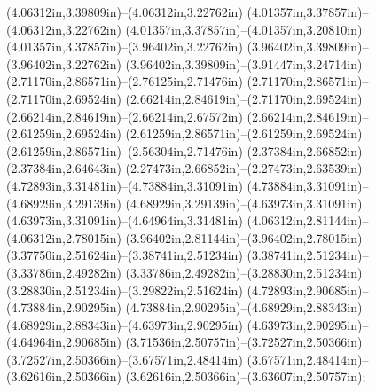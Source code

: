 (4.06312in,3.39809in)--(4.06312in,3.22762in) (4.01357in,3.37857in)--(4.06312in,3.22762in) (4.01357in,3.37857in)--(4.01357in,3.20810in) (4.01357in,3.37857in)--(3.96402in,3.22762in) (3.96402in,3.39809in)--(3.96402in,3.22762in) (3.96402in,3.39809in)--(3.91447in,3.24714in) (2.71170in,2.86571in)--(2.76125in,2.71476in) (2.71170in,2.86571in)--(2.71170in,2.69524in) (2.66214in,2.84619in)--(2.71170in,2.69524in) (2.66214in,2.84619in)--(2.66214in,2.67572in) (2.66214in,2.84619in)--(2.61259in,2.69524in) (2.61259in,2.86571in)--(2.61259in,2.69524in) (2.61259in,2.86571in)--(2.56304in,2.71476in) (2.37384in,2.66852in)--(2.37384in,2.64643in) (2.27473in,2.66852in)--(2.27473in,2.63539in) (4.72893in,3.31481in)--(4.73884in,3.31091in) (4.73884in,3.31091in)--(4.68929in,3.29139in) (4.68929in,3.29139in)--(4.63973in,3.31091in) (4.63973in,3.31091in)--(4.64964in,3.31481in) (4.06312in,2.81144in)--(4.06312in,2.78015in) (3.96402in,2.81144in)--(3.96402in,2.78015in) (3.37750in,2.51624in)--(3.38741in,2.51234in) (3.38741in,2.51234in)--(3.33786in,2.49282in) (3.33786in,2.49282in)--(3.28830in,2.51234in) (3.28830in,2.51234in)--(3.29822in,2.51624in) (4.72893in,2.90685in)--(4.73884in,2.90295in) (4.73884in,2.90295in)--(4.68929in,2.88343in) (4.68929in,2.88343in)--(4.63973in,2.90295in) (4.63973in,2.90295in)--(4.64964in,2.90685in) (3.71536in,2.50757in)--(3.72527in,2.50366in) (3.72527in,2.50366in)--(3.67571in,2.48414in) (3.67571in,2.48414in)--(3.62616in,2.50366in) (3.62616in,2.50366in)--(3.63607in,2.50757in);
